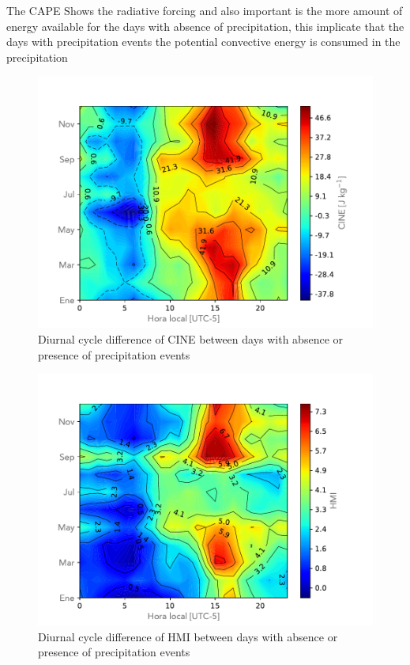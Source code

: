 \documentclass{ametsoc}
\begin{document}
The CAPE Shows the radiative forcing and also important is the more amount of energy available for the days with absence of precipitation, this implicate that the days with precipitation events the potential convective energy is consumed in the precipitation



\begin{figure}[h!]
\centering
\includegraphics[width=1.0\linewidth]{Figuras/CINE_Matrix_resta.pdf}
\caption{Diurnal cycle difference of CINE between days with absence or presence of precipitation events }
\label{fig:CINEdifference}
\end{figure}


\begin{figure}[h!]
\centering
\includegraphics[width=1.0\linewidth]{Figuras/HMI_Matrix_resta.pdf}
\caption{Diurnal cycle difference of HMI between days with absence or presence of precipitation events }
\label{fig:HMIdifference}
\end{figure}
\end{document}
